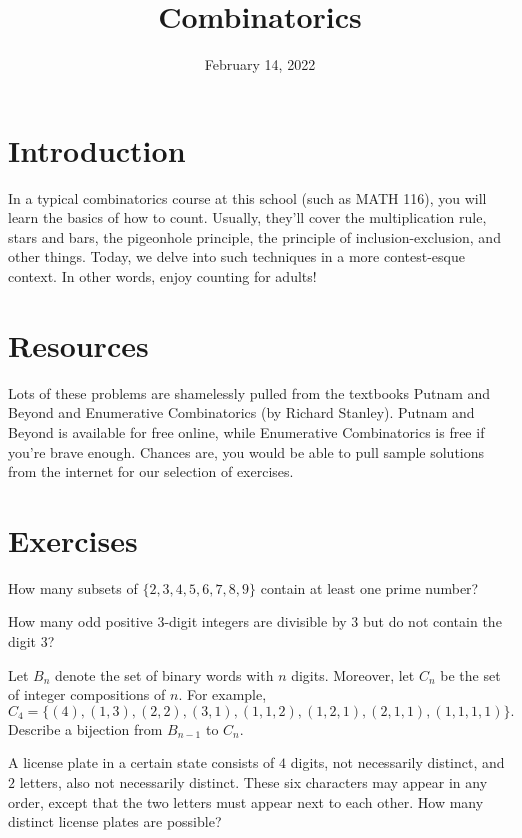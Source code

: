 \documentclass{article}
\title{Combinatorics}
\author{}
\date{February 14, 2022}
\begin{document}
\section{Introduction}
In a typical combinatorics course at this school (such as MATH 116), you will learn the basics of how to count. Usually, they'll cover the multiplication rule, stars and bars, the pigeonhole principle, the principle of inclusion-exclusion, and other things. Today, we delve into such techniques in a more contest-esque context. In other words, enjoy counting for adults!



\section{Resources}
Lots of these problems are shamelessly pulled from the textbooks Putnam and Beyond and Enumerative Combinatorics (by Richard Stanley). Putnam and Beyond is available for free online, while Enumerative Combinatorics is free if you're brave enough. Chances are, you would be able to pull sample solutions from the internet for our selection of exercises.

\section{Exercises}

\begin{exercise} 
How many subsets of $\{2,3,4,5,6,7,8,9\}$ contain at least one prime number?
\end{exercise}

\begin{exercise}
    How many odd positive $3$-digit integers are divisible by $3$ but do not contain the digit $3$?
\end{exercise}

\begin{exercise}
Let $B_{n}$ denote the set of binary words with $n$ digits. Moreover, let $C_{n}$ be the set of integer compositions of $n$. For example,
\[C_{4} = \{(4), (1,3), (2,2), (3,1), (1,1,2), (1,2,1), (2,1,1), (1,1,1,1)\}.\] 
Describe a bijection from $B_{n - 1}$ to $C_{n}$. 
\end{exercise}

\begin{exercise} 
    A license plate in a certain state consists of $4$ digits, not necessarily distinct, and $2$ letters, also not necessarily distinct. These six characters may appear in any order, except that the two letters must appear next to each other. How many distinct license plates are possible?
\end{exercise}
\end{document}
